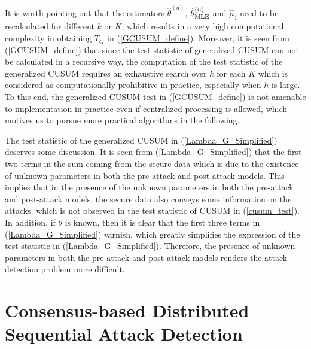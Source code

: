 \documentclass[11pt, draftclsnofoot, onecolumn]{IEEEtran}
\begin{document}


It is worth pointing out that the estimators  ${{{\hat \theta }^{(a)}}}$, ${\hat \theta _{{\rm{MLE}}}^{(u)}}$ and ${{\hat \mu }_j}$ need to be recalculated for different $k$ or $K$, which results in a very high computational complexity in obtaining $T_G$ in (\ref{GCUSUM_define}). 
  Moreover, it is seen from (\ref{GCUSUM_define}) that  since the test statistic of generalized CUSUM can not be calculated in a recursive way, the computation of the test statistic of the generalized CUSUM requires an exhaustive search over $k$ for each $K$ which is considered as computationally prohibitive in practice, especially when $h$ is large.
To this end,  the generalized CUSUM test in (\ref{GCUSUM_define}) is not amenable to implementation in practice even if  centralized processing is allowed, which motives us to pursue more practical algorithms in the following.  


The test statistic of the generalized CUSUM in (\ref{Lambda_G_Simplified}) deserves some discussion. 
It is seen from (\ref{Lambda_G_Simplified}) that the first two terms in the sum coming from the secure data which is due to the existence of unknown parameters in  both the pre-attack and post-attack models. This implies that in the presence of the unknown parameters in  both the pre-attack and post-attack models, the secure data also conveys some information on the attacks, which is not observed in the test statistic of CUSUM in (\ref{cusum_test}).
In addition, if $\theta$ is known, then it is clear that the first three terms in (\ref{Lambda_G_Simplified}) varnish, which greatly simplifies the expression of the test statistic in (\ref{Lambda_G_Simplified}). Therefore, the presence of unknown parameters in  both the pre-attack and post-attack models renders the attack detection problem more difficult.

\section{Consensus-based Distributed Sequential Attack Detection}
\label{Section_DCUSUM}
\end{document}
